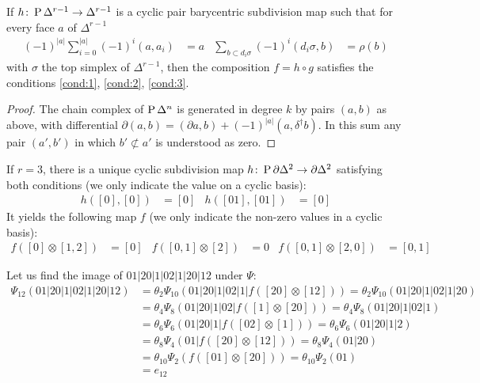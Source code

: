 \begin{proposition}
    If $h\colon \operatorname{P} \Delta^{r-1}\to \Delta^{r-1}$ is a cyclic pair barycentric subdivision map such that for every face $a$ of $\Delta^{r-1}$
    \begin{align*}
        (-1)^{|a|}\sum_{i=0}^{|a|}(-1)^i (a,a_i) &= a &
        \sum_{b\subset d_i\sigma}(-1)^i(d_i\sigma,b) &= \rho(b)
    \end{align*}
    with $\sigma$ the top simplex of $\Delta^{r-1}$, then the composition $f = h\circ g$ satisfies the conditions \eqref{cond:1}, \eqref{cond:2}, \eqref{cond:3}.
\end{proposition}
\begin{proof}
    The chain complex of $\operatorname{P} \Delta^n$ is generated in degree $k$ by pairs $(a,b)$ as above, with differential $\partial(a,b) = (\partial a,b) + (-1)^{|a|}(a,\delta^\dagger b)$. In this sum any pair $(a',b')$ in which $b'\not\subset a'$ is understood as zero.
\end{proof}
If $r=3$, there is a unique cyclic subdivision map $h\colon \operatorname{P} \partial \Delta^{2}\to \partial \Delta^2$ satisfying both conditions (we only indicate the value on a cyclic basis):
\begin{align*}
    h([0],[0]) &= [0] &
    h([01],[01]) &= [0]
\end{align*}
It yields the following map $f$ (we only indicate the non-zero values in a cyclic basis):
\begin{align*}
f([0]\otimes [1,2]) &= [0] &
f([0,1]\otimes [2])&=0 &
f([0,1]\otimes [2,0]) &= [0,1]
\end{align*}
\begin{example}\label{ex:107}
    Let us find the image of $01|20|1|02|1|20|12$ under $\Psi$:
    \begin{align*}
        \Psi_{12}(01|20|1|02|1|20|12) &= \theta_2\Psi_{10}(01|20|1|02|1|f([20]\otimes[12])) = \theta_2\Psi_{10}(01|20|1|02|1|20)
        \\ &= \theta_4\Psi_8(01|20|1|02|f([1]\otimes [20])) = \theta_4\Psi_8(01|20|1|02|1)
        \\ &= \theta_6\Psi_6(01|20|1|f([02]\otimes [1])) = \theta_6\Psi_6(01|20|1|2)
        \\ &= \theta_8\Psi_4(01|f([20]\otimes [12])) = \theta_8\Psi_4(01|20)
        \\ &= \theta_{10}\Psi_2(f([01]\otimes [20])) = \theta_{10}\Psi_2(01)
        \\ &= e_{12}
    \end{align*}
\end{example}
